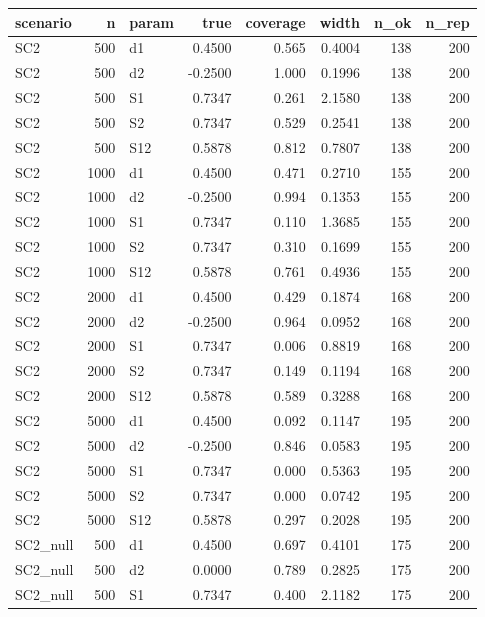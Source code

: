 \begin{table}[ht]
\centering
\begin{tabular}{lrlrrrrr}
  \hline
scenario & n & param & true & coverage & width & n\_ok & n\_rep \\ 
  \hline
SC2 & 500 & d1 & 0.4500 & 0.565 & 0.4004 & 138 & 200 \\ 
  SC2 & 500 & d2 & -0.2500 & 1.000 & 0.1996 & 138 & 200 \\ 
  SC2 & 500 & S1 & 0.7347 & 0.261 & 2.1580 & 138 & 200 \\ 
  SC2 & 500 & S2 & 0.7347 & 0.529 & 0.2541 & 138 & 200 \\ 
  SC2 & 500 & S12 & 0.5878 & 0.812 & 0.7807 & 138 & 200 \\ 
  SC2 & 1000 & d1 & 0.4500 & 0.471 & 0.2710 & 155 & 200 \\ 
  SC2 & 1000 & d2 & -0.2500 & 0.994 & 0.1353 & 155 & 200 \\ 
  SC2 & 1000 & S1 & 0.7347 & 0.110 & 1.3685 & 155 & 200 \\ 
  SC2 & 1000 & S2 & 0.7347 & 0.310 & 0.1699 & 155 & 200 \\ 
  SC2 & 1000 & S12 & 0.5878 & 0.761 & 0.4936 & 155 & 200 \\ 
  SC2 & 2000 & d1 & 0.4500 & 0.429 & 0.1874 & 168 & 200 \\ 
  SC2 & 2000 & d2 & -0.2500 & 0.964 & 0.0952 & 168 & 200 \\ 
  SC2 & 2000 & S1 & 0.7347 & 0.006 & 0.8819 & 168 & 200 \\ 
  SC2 & 2000 & S2 & 0.7347 & 0.149 & 0.1194 & 168 & 200 \\ 
  SC2 & 2000 & S12 & 0.5878 & 0.589 & 0.3288 & 168 & 200 \\ 
  SC2 & 5000 & d1 & 0.4500 & 0.092 & 0.1147 & 195 & 200 \\ 
  SC2 & 5000 & d2 & -0.2500 & 0.846 & 0.0583 & 195 & 200 \\ 
  SC2 & 5000 & S1 & 0.7347 & 0.000 & 0.5363 & 195 & 200 \\ 
  SC2 & 5000 & S2 & 0.7347 & 0.000 & 0.0742 & 195 & 200 \\ 
  SC2 & 5000 & S12 & 0.5878 & 0.297 & 0.2028 & 195 & 200 \\ 
  SC2\_null & 500 & d1 & 0.4500 & 0.697 & 0.4101 & 175 & 200 \\ 
  SC2\_null & 500 & d2 & 0.0000 & 0.789 & 0.2825 & 175 & 200 \\ 
  SC2\_null & 500 & S1 & 0.7347 & 0.400 & 2.1182 & 175 & 200 \\ 

\end{tabular}
\end{table}
